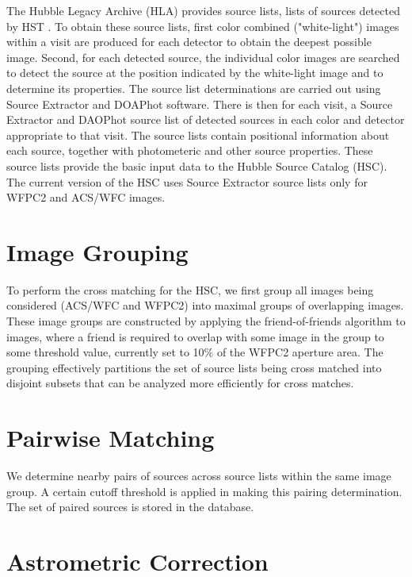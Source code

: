 The Hubble Legacy Archive (HLA) provides source lists, lists of sources detected by HST \cite{2008ASPC..394..481W}. To obtain these source lists, first color combined ("white-light") images within a visit are produced for each detector to obtain the deepest possible image. Second, for each detected source, the individual color images are searched to detect the source at the position indicated by the white-light image and to determine its properties. The source list determinations are carried out using Source Extractor and DOAPhot software. There is then for each visit, a Source Extractor and DAOPhot source list of detected sources in each color and detector appropriate to that visit.  The source lists contain positional information about each source, together with photometeric and other source properties. These source lists provide the basic input data to the Hubble Source Catalog (HSC). The current version of the HSC uses Source Extractor source lists only for WFPC2 and ACS/WFC images.

\section{Image Grouping}
To perform the cross matching for the HSC, we first group all images being considered (ACS/WFC and WFPC2) into maximal groups of overlapping images.  These image groups are constructed by applying the friend-of-friends algorithm to images, where a friend is required to overlap with some image in the group to some threshold value, currently set to 10\% of the WFPC2 aperture area. The grouping effectively partitions the set of source lists being cross matched into disjoint subsets that can be analyzed more efficiently for cross matches.

\section{Pairwise Matching}

We determine nearby pairs of sources across source lists within the same image group. A certain cutoff threshold is applied in making this pairing determination. The set of paired sources is stored in the database.

\section{Astrometric Correction}

